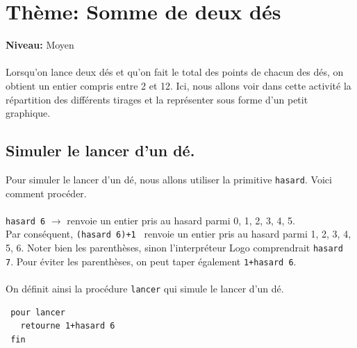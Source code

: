 \chapter{Thème: Somme de deux dés}
{ }\hfill\textbf{Niveau:} Moyen\\ \\
Lorsqu'on lance deux dés et qu'on fait le total des points de chacun des dés, on obtient un entier compris entre 2 et 12. Ici, nous allons voir dans cette activité la répartition des différents tirages et la représenter sous forme d'un petit graphique.
\section{Simuler le lancer d'un dé.}
\noindent Pour simuler le lancer d'un dé, nous allons utiliser la primitive \texttt{hasard}. Voici comment procéder.\\ \\
\texttt{hasard 6} $\longrightarrow$ renvoie un entier pris au hasard parmi 0, 1, 2, 3, 4, 5.\\
Par conséquent, \texttt{(hasard 6)+1 } renvoie un entier pris au hasard parmi 1, 2, 3, 4, 5, 6. Noter bien les parenthèses, sinon l'interpréteur Logo comprendrait \texttt{hasard 7}. Pour éviter les parenthèses, on peut taper également \texttt{1+hasard 6}.\\ \\
On définit ainsi la procédure \texttt{lancer} qui simule le lancer d'un dé.
\begin{verbatim}
 pour lancer
   retourne 1+hasard 6
 fin
\end{verbatim}
